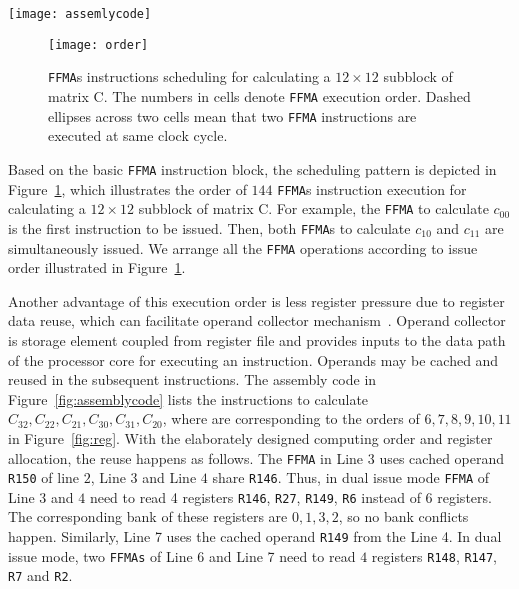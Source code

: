 \begin{figure*}[htbp]
\begin{center}
\texttt{[image: assemlycode]}
    \caption{The comparison of compiler generated codes and our tuned assembly codes.}
\label{fig:assemblycode}
\end{center}
\end{figure*}

\begin{figure}[htbp]
\begin{center}
\texttt{[image: order]}
\caption{{\tt FFMA}s instructions scheduling for calculating a $12\times 12$ subblock of matrix C.  The numbers in 
cells denote {\tt FFMA} execution order. Dashed ellipses across two cells mean that two {\tt FFMA} instructions are 
executed at same clock cycle.}
\label{fig:order}
\end{center}
\end{figure}

Based on the basic {\tt FFMA} instruction block, the scheduling pattern is depicted in Figure~\ref{fig:order}, which
illustrates the order of $144$ {\tt FFMA}s instruction execution for calculating a $12\times 12$ subblock of matrix C.
For example, the {\tt FFMA} to calculate $c_{00}$ is the first instruction to be issued. Then, both {\tt FFMA}s to
calculate $c_{10}$ and  $c_{11}$ are simultaneously issued. We arrange all the {\tt FFMA} operations according to issue
order illustrated in Figure~\ref{fig:order}.

Another advantage of this execution order is less register pressure due to register data reuse, which can facilitate
operand collector mechanism~\cite{collector}. Operand collector is storage element coupled from register file and
provides inputs to the data path of the processor core for executing an instruction. Operands may be cached and reused
in the subsequent instructions. 
The assembly code in Figure~\ref{fig:assemblycode} lists the instructions to calculate $C_{32},C_{22}, C_{21}, C_{30}, 
C_{31}, C_{20}$, where are corresponding to the orders of $6,7,8,9,10,11$ in Figure~\ref{fig:reg}. 
With the elaborately designed computing order and register allocation, the reuse happens as follows. The {\tt FFMA} in 
Line $3$ uses cached operand {\tt R150} of line $2$, Line $3$ and Line $4$ share {\tt R146}. Thus, in dual issue mode 
{\tt FFMA} of Line $3$ and $4$ need to read 4 registers {\tt R146}, {\tt R27}, {\tt R149}, {\tt R6} instead of $6$ 
registers. The corresponding bank of these registers are $0,1,3,2$, so no bank conflicts happen.
Similarly, Line 7 uses the cached operand {\tt R149} from the Line 4. In dual issue mode, two {\tt FFMAs} of Line 6 and 
Line 7 need to read $4$ registers {\tt R148}, {\tt R147}, {\tt R7} and {\tt R2}.

